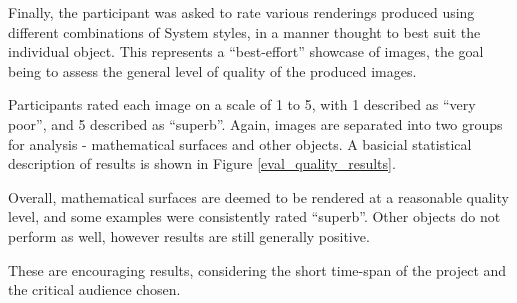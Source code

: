 Finally, the participant was asked to rate various renderings produced using different combinations of System styles, in a manner thought to best suit the individual object. This represents a ``best-effort'' showcase of images, the goal being to assess the general level of quality of the produced images.

Participants rated each image on a scale of 1 to 5, with 1 described as ``very poor'', and 5 described as ``superb''. 
Again, images are separated into two groups for analysis - mathematical surfaces and other objects.
A basicial statistical description of results is shown in Figure \ref{eval_quality_results}.

Overall, mathematical surfaces are deemed to be rendered at a reasonable quality level, and some examples were consistently rated ``superb''.
Other objects do not perform as well, however results are still generally positive.

These are encouraging results, considering the short time-span of the project and the critical audience chosen.

	
